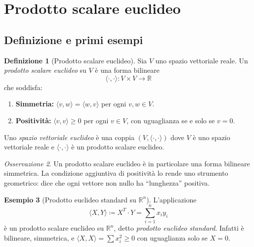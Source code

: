 \documentclass[11pt, a4paper]{book}
\theoremstyle{definition}
\newtheorem{definizione}{Definizione}[section]
\newtheorem{esempio}[definizione]{Esempio}
\theoremstyle{plain}
\theoremstyle{remark}
\newtheorem{osservazione}[definizione]{Osservazione}
\newcommand{\R}{\mathbb{R}}
\begin{document}
\section{Prodotto scalare euclideo}
\label{sec:prodotto-scalare}

\subsection{Definizione e primi esempi}

\begin{defbox}
\begin{definizione}[Prodotto scalare euclideo]
\label{def:prodotto-scalare}
Sia $V$ uno spazio vettoriale reale. Un \emph{prodotto scalare euclideo} su $V$ è una forma bilineare
\[
  \langle\cdot,\cdot\rangle \colon V \times V \longrightarrow \R
\]
che soddisfa:
\begin{enumerate}
  \item \textbf{Simmetria:} $\langle v,w\rangle = \langle w,v\rangle$ per ogni $v,w \in V$.
  \item \textbf{Positività:} $\langle v,v\rangle \geq 0$ per ogni $v \in V$, con uguaglianza se e solo se $v = 0$.
\end{enumerate}
Uno \emph{spazio vettoriale euclideo} è una coppia $(V,\langle\cdot,\cdot\rangle)$ dove $V$ è uno spazio vettoriale reale e $\langle\cdot,\cdot\rangle$ è un prodotto scalare euclideo.
\end{definizione}
\end{defbox}

\begin{osservazione}
Un prodotto scalare euclideo è in particolare una forma bilineare simmetrica. La condizione aggiuntiva di positività lo rende uno strumento geometrico: dice che ogni vettore non nullo ha ``lunghezza'' positiva.
\end{osservazione}

\begin{exbox}
\begin{esempio}[Prodotto euclideo standard su $\R^n$]
\label{es:prodotto-standard}
L'applicazione
\[
  \langle X, Y\rangle \coloneqq X^T \cdot Y = \sum_{i=1}^n x_i y_i
\]
è un prodotto scalare euclideo su $\R^n$, detto \emph{prodotto euclideo standard}. Infatti è bilineare, simmetrica, e $\langle X,X\rangle = \sum x_i^2 \geq 0$ con uguaglianza solo se $X=0$.
\end{esempio}
\end{exbox}
\end{document}
